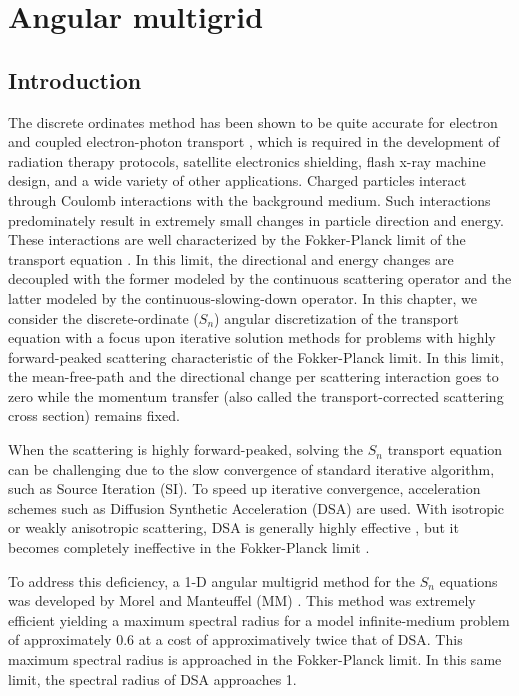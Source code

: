 \chapter{Angular multigrid}
\section{Introduction}
The discrete ordinates method has been shown to be quite accurate for electron
and coupled electron-photon transport \cite{morel_81,accuracy_1,accuracy_2}, 
which is required in the development of radiation therapy protocols, satellite 
electronics shielding, flash x-ray machine design, and a wide variety of other 
applications. Charged particles interact through Coulomb interactions with the 
background medium. Such interactions predominately result in extremely small changes 
in particle direction and energy. These interactions are well characterized by the
Fokker-Planck limit of the transport equation \cite{fp_limit,morel_96}. In this limit,
the directional and energy changes are decoupled with the former modeled by the
continuous scattering operator and the latter modeled by the continuous-slowing-down 
operator. In this chapter, we consider the discrete-ordinate ($S_n$) angular 
discretization of the transport equation with a focus upon iterative solution methods 
for problems with highly forward-peaked scattering characteristic of the 
Fokker-Planck limit. In this limit, the mean-free-path and the directional 
change per scattering interaction goes to zero while the momentum transfer 
(also called the transport-corrected scattering cross section) remains fixed.

When the scattering is highly forward-peaked, solving the $S_n$ transport
equation can be challenging due to the slow convergence of standard iterative
algorithm, such as Source Iteration (SI). To speed up iterative convergence,
acceleration schemes such as Diffusion Synthetic Acceleration (DSA) are used.
With isotropic or weakly anisotropic scattering, DSA is generally highly
effective \cite{dsa_ref}, but it becomes completely ineffective in the
Fokker-Planck limit \cite{multigrid_1d}.

To address this deficiency, a 1-D angular multigrid method for the $S_n$
equations was developed by Morel and Manteuffel (MM) \cite{multigrid_1d}. This
method was extremely efficient yielding a maximum spectral radius for 
a model infinite-medium problem of approximately 0.6 at a cost of
approximatively twice that of DSA. This maximum spectral radius is approached
in the Fokker-Planck limit. In this same limit, the spectral radius of DSA
approaches 1. 

